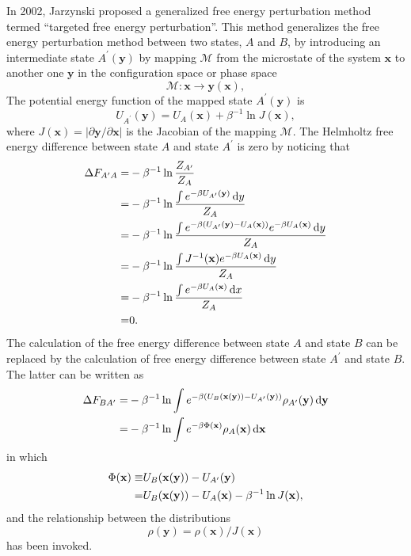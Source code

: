In 2002, Jarzynski proposed a generalized free energy perturbation method termed ``targeted free energy perturbation''.\cite{JarzynskiPRE2002} This method generalizes the free energy perturbation method between two states, $A$ and $B$, by introducing an intermediate state $A^\prime(\mathbf{y})$ by mapping $\mathcal{M}$ from the microstate of the system $\mathbf{x}$ to another one $\mathbf{y}$ in the configuration space or phase space
\begin{equation}
	\mathcal{M}: \mathbf{x} \to \mathbf{y}(\mathbf{x}),
\end{equation}
The potential energy function of the mapped state $A^\prime(\mathbf{y})$ is
\begin{equation}
	U_{A^\prime}(\mathbf{y})=U_A(\mathbf{x})+\beta^{-1}\ln J(\mathbf{x}),
\end{equation}
where $J(\mathbf{x})=|\partial \mathbf{y}/\partial \mathbf{x}|$ is the Jacobian of the mapping $\mathcal{M}$. The Helmholtz free energy difference between state $A$ and state $A^\prime$ is zero by noticing that
\begin{align*}
	\Delta F_{A^\prime A}=&-\beta^{-1}\ln\frac{Z_{A^\prime}}{Z_A}\notag\\
	                     =&-\beta^{-1}\ln \frac{\int e^{-\beta U_{A^\prime}(\mathbf{y})}\mathop{}\!\mathrm{d} y}{Z_A}\notag\\
	                     =&-\beta^{-1}\ln \frac{\int e^{-\beta (U_{A^\prime}(\mathbf{y})-U_A(\mathbf{x}))}e^{-\beta U_A(\mathbf{x})}\mathop{}\!\mathrm{d} y}{Z_A}\notag\\
	                     =&-\beta^{-1}\ln \frac{\int J^{-1}(\mathbf{x})e^{-\beta U_A(\mathbf{x})}\mathop{}\!\mathrm{d} y}{Z_A}\notag\\
	                     =&-\beta^{-1}\ln \frac{\int e^{-\beta U_A(\mathbf{x})}\mathop{}\!\mathrm{d} x}{Z_A}\notag\\
	                     =&0.
\end{align*}
The calculation of the free energy difference between state $A$ and state $B$ can be replaced by the calculation of free energy difference between state $A^\prime$ and state $B$. The latter can be written as
\begin{align}
	\Delta F_{BA^\prime}=&-\beta^{-1}\ln {\int e^{-\beta (U_B(\mathbf{x}(\mathbf{y}))-U_{A^\prime}(\mathbf{y}))}\rho_{A^\prime}(\mathbf{y})\mathop{}\!\mathrm{d}\mathbf{y}}\notag\\
	                    =&-\beta^{-1}\ln {\int e^{-\beta \Phi(\mathbf{x})}\rho_{A}(\mathbf{x})\mathop{}\!\mathrm{d}\mathbf{x}}
\end{align}
in which 
\begin{align}
	\Phi(\mathbf{x})\equiv& U_B(\mathbf{x}(\mathbf{y})) - U_{A^\prime}(\mathbf{y})\notag\\
	                =&U_B(\mathbf{x}(\mathbf{y}))-U_A(\mathbf{x})-\beta^{-1}\ln J(\mathbf{x}),
\end{align}
and the relationship between the distributions
\begin{equation}
	\rho(\mathbf{y})=\rho(\mathbf{x})/J(\mathbf{x})
	\label{Eq:FEM:TP:TFEPdistribution}
\end{equation}
has been invoked.

